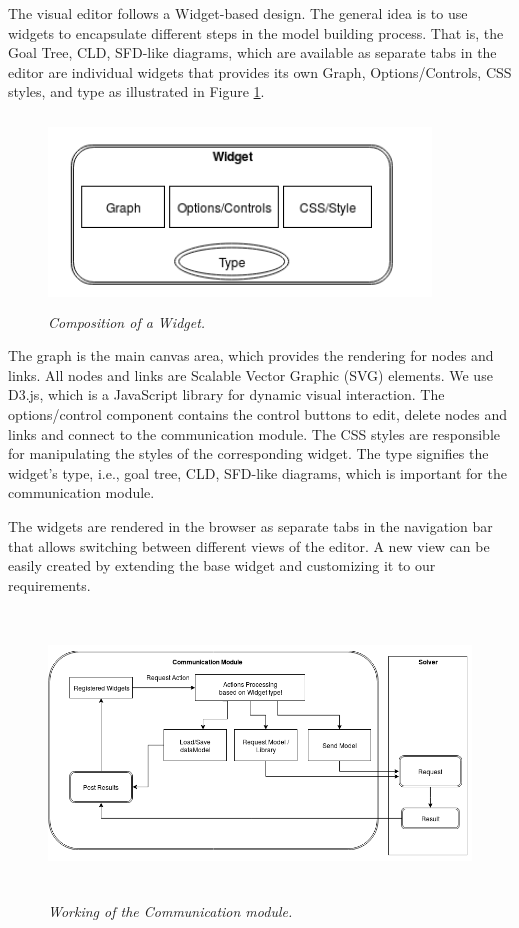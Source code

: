\documentclass[a4paper]{article}
\begin{document}
The visual editor follows a Widget-based design. The general idea is to use widgets to encapsulate different steps in the model building process. That is, the Goal Tree, CLD, SFD-like diagrams, which are available as separate tabs in the editor are individual widgets that provides its own Graph, Options/Controls, CSS styles, and type as illustrated in Figure \ref{fig:widget}.

\begin{figure}
\begin{center}
\includegraphics[height=2in,width=4in]{img/widget.png}
\caption{\small \sl Composition of a Widget.\label{fig:widget}}
\end{center}
\end{figure}

The graph is the main canvas area, which provides the rendering for nodes and links. All nodes and links are Scalable Vector Graphic (SVG) elements. We use D3.js, which is a JavaScript library for dynamic visual interaction. The options/control component contains the control buttons to edit, delete nodes and links and connect to the communication module. The CSS styles are responsible for manipulating the styles of the corresponding widget. The type signifies the widget’s type, i.e., goal tree, CLD, SFD-like diagrams, which is important for the communication module.

The widgets are rendered in the browser as separate tabs in the navigation bar that allows switching between different views of the editor. A new view can be easily created by extending the base widget and customizing it to our requirements.

\begin{figure}
\begin{center}
\includegraphics[height=3in,width=5in]{img/communication.png}
\caption{\small \sl Working of the Communication module.\label{fig:communication}}
\end{center}
\end{figure}
\end{document}
